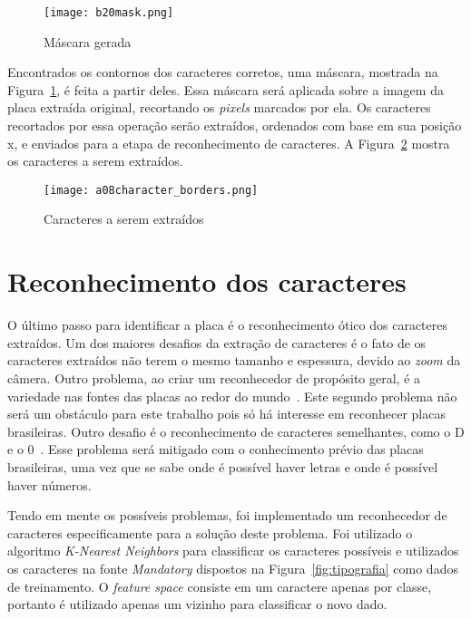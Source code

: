\begin{figure}[H]
	\centering
	\texttt{[image: b20mask.png]}
	\caption{Máscara gerada}
	\label{fig:mascara}
\end{figure}

Encontrados os contornos dos caracteres corretos, uma máscara, mostrada na Figura~\ref{fig:mascara}, é feita a partir deles. Essa máscara será aplicada sobre a imagem da placa extraída original, recortando os \emph{pixels} marcados por ela. Os caracteres recortados por essa operação serão extraídos, ordenados com base em sua posição x, e enviados para a etapa de reconhecimento de caracteres. A Figura~\ref{fig:caracteres_extraidos} mostra os caracteres a serem extraídos. 

\begin{figure}[H]
	\centering
	\texttt{[image: a08character\_borders.png]}
	\caption{Caracteres a serem extraídos}
	\label{fig:caracteres_extraidos}
\end{figure}

\section{Reconhecimento dos caracteres} \label{sec:reconhecimento}

O último passo para identificar a placa é o reconhecimento ótico dos
caracteres extraídos. Um dos maiores desafios da extração de caracteres é o fato de
os caracteres extraídos não terem o mesmo tamanho e espessura, devido ao
\emph{zoom} da câmera. Outro problema, ao criar um reconhecedor de propósito
geral, é a variedade nas fontes das placas ao redor do mundo~\cite{s2013automatic}. Este segundo problema não será um obstáculo para este trabalho pois só há interesse em reconhecer placas brasileiras. Outro desafio é o reconhecimento de caracteres semelhantes, como o D e o
0~\cite{ho2016intelligent}. Esse problema será mitigado com o conhecimento
prévio das placas brasileiras, uma vez que se sabe onde é possível haver letras e onde é possível haver números.

Tendo em mente os possíveis problemas, foi implementado um reconhecedor de caracteres especificamente para a solução deste problema. Foi utilizado o algoritmo \emph{K-Nearest Neighbors} para classificar os caracteres possíveis e utilizados os caracteres na fonte \emph{Mandatory} dispostos na Figura~\ref{fig:tipografia} como dados de treinamento. O \emph{feature space} consiste em um caractere apenas por classe, portanto é utilizado apenas um vizinho para classificar o novo dado.

